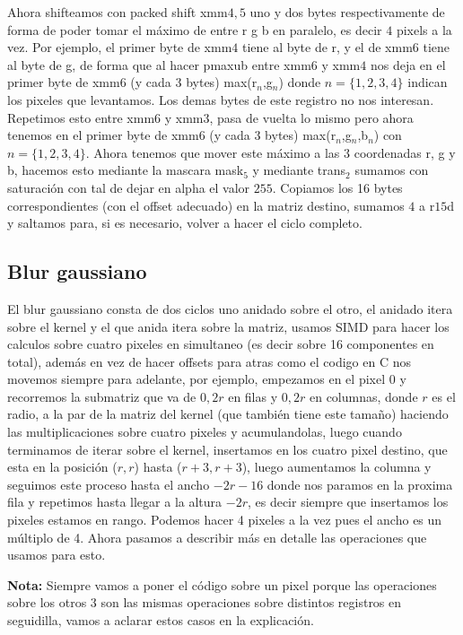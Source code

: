\documentclass[a4paper]{article}
\begin{document}
 Ahora shifteamos con packed shift xmm$4,5$ uno y dos bytes respectivamente de forma de poder tomar el máximo de entre r g b en paralelo, es decir $4$ pixels a la vez. Por ejemplo, el primer byte de xmm$4$ tiene al byte de r, y el de xmm$6$ tiene al byte de g, de forma que al hacer pmaxub entre  xmm$6$ y xmm$4$ nos deja en el primer byte de xmm$6$ (y cada 3 bytes) max(r$_n$,g$_n$) donde $n = \{1,2,3,4 \}$ indican los pixeles que levantamos. Los demas bytes de este registro no nos interesan. Repetimos esto entre xmm$6$ y xmm$3$, pasa de vuelta lo mismo pero ahora tenemos en el primer byte de xmm$6$ (y cada $3$ bytes) max(r$_n$,g$_n$,b$_n$) con $n = \{1,2,3,4 \}$. Ahora tenemos que mover este máximo a las 3 coordenadas r, g y b, hacemos esto mediante la mascara mask$_5$ y mediante trans$_2$ sumamos con saturación con tal de dejar en alpha el valor $255$. Copiamos los 16 bytes correspondientes (con el offset adecuado) en la matriz destino, sumamos $4$ a r$15$d y saltamos para, si es necesario, volver a hacer el ciclo completo.


\subsection{Blur gaussiano}

 El blur gaussiano consta de dos ciclos uno anidado sobre el otro, el anidado itera sobre el kernel y el que anida itera sobre la matriz, usamos SIMD para hacer los calculos sobre cuatro pixeles en simultaneo (es decir sobre 16 componentes en total), además en vez de hacer offsets para atras como el codigo en C nos movemos siempre para adelante, por ejemplo, empezamos en el pixel $0$ y recorremos la submatriz que va de $0, 2r$ en filas y $0, 2r$ en columnas, donde $r$ es el radio, a la par de la matriz del kernel (que también tiene este tamaño) haciendo las multiplicaciones sobre cuatro pixeles y acumulandolas, luego cuando terminamos de iterar sobre el kernel, insertamos en los cuatro pixel destino, que esta en la posición ($r, r$) hasta ($r+3, r+3$), luego aumentamos la columna y seguimos este proceso hasta el ancho $- 2r - 16$ donde nos paramos en la proxima fila y repetimos hasta llegar a la altura $- 2r$, es decir siempre que insertamos los pixeles estamos en rango. Podemos hacer 4 pixeles a la vez pues el ancho es un múltiplo de 4. Ahora pasamos a describir más en detalle las operaciones que usamos para esto. \newline
 
\noindent \textbf{Nota:} Siempre vamos a poner el código sobre un pixel porque las operaciones sobre los otros 3 son las mismas operaciones sobre distintos registros en seguidilla, vamos a aclarar estos casos en la explicación.
\newline
\end{document}
